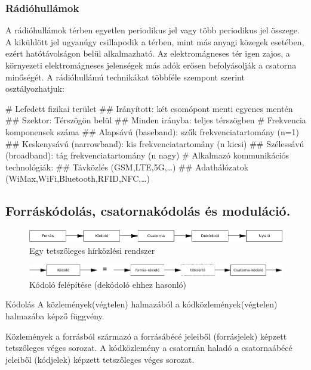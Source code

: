 \subsubsection{Rádióhullámok}
A rádióhullámok térben egyetlen periodikus jel vagy több periodikus jel összege. A kiküldött jel ugyanúgy csillapodik a térben, mint más anyagi közegek esetében, ezért hatótávolságon belül alkalmazható. Az elektromágneses tér igen zajos, a környezeti elektromágneses jelenségek más adók erősen befolyásolják a csatorna minőségét. A rádióhullámú technikákat többféle szempont szerint osztályozhatjuk:
\begin{easylist}[nosep]
	# Lefedett fizikai terület
	## Irányított: két csomópont menti egyenes mentén
	## Szektor: Térszögön belül
	## Minden irányba: teljes térszögben
	# Frekvencia komponensek száma
	## Alapsávú (baseband): szűk frekvenciatartomány (n=1)
	## Keskenysávú (narrowband): kis frekvenciatartomány (n kicsi)
	## Szélessávú (broadband): tág frekvenciatartomány (n nagy)
	# Alkalmazó kommunikációs technológiák:
	## Távközlés (GSM,LTE,5G,\dots)
	## Adathálózatok (WiMax,WiFi,Bluetooth,RFID,NFC,\dots)
\end{easylist}

\subsection{Forráskódolás, csatornakódolás és moduláció.}
\begin{figure}[h]
	\centering
	\includegraphics[width=0.5\linewidth]{fig/12-hirkozlesi_rendszer}
	\caption{Egy tetszőleges hírközlési rendszer}
	\label{fig:12-hirkozlesirendszer}
\end{figure}
\begin{figure}[h]
	\centering
	\includegraphics[width=0.7\linewidth]{fig/12-kodolo_felepitese}
	\caption{Kódoló felépítése (dekódoló ehhez hasonló)}
	\label{fig:12-kodolofelepitese}
\end{figure}

\begin{definition}{Kódolás}
	A közlemények(végtelen) halmazából a kódközlemények(végtelen) halmazába képző függvény.
\end{definition}
\begin{note}
	Közlemények a forrásból származó a forrásábécé jeleiből (forrásjelek) képzett tetszőleges véges sorozat. A kódközlemény a csatornán haladó a csatornaábécé jeleiből (kódjelek) képzett tetszőleges véges sorozat.
\end{note}
